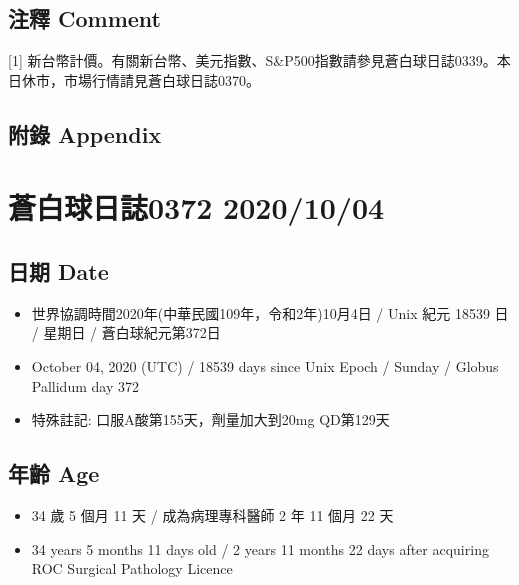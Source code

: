 \documentclass[
]{article}
\providecommand{\tightlist}{%
  \setlength{\itemsep}{0pt}\setlength{\parskip}{0pt}}
\begin{document}
\hypertarget{ux6ce8ux91cb-comment-2}{%
\subsection{注釋 Comment}\label{ux6ce8ux91cb-comment-2}}

{[}1{]}
新台幣計價。有關新台幣、美元指數、S\&P500指數請參見蒼白球日誌0339。本日休市，市場行情請見蒼白球日誌0370。

\hypertarget{ux9644ux9304-appendix-2}{%
\subsection{附錄 Appendix}\label{ux9644ux9304-appendix-2}}

\hypertarget{ux84bcux767dux7403ux65e5ux8a8c0372-20201004}{%
\section{蒼白球日誌0372
2020/10/04}\label{ux84bcux767dux7403ux65e5ux8a8c0372-20201004}}

\hypertarget{ux65e5ux671f-date-3}{%
\subsection{日期 Date}\label{ux65e5ux671f-date-3}}

\begin{itemize}
\tightlist
\item
  世界協調時間2020年(中華民國109年，令和2年)10月4日 / Unix 紀元 18539 日
  / 星期日 / 蒼白球紀元第372日
\item
  October 04, 2020 (UTC) / 18539 days since Unix Epoch / Sunday / Globus
  Pallidum day 372
\item
  特殊註記: 口服A酸第155天，劑量加大到20mg QD第129天
\end{itemize}

\hypertarget{ux5e74ux9f61-age-3}{%
\subsection{年齡 Age}\label{ux5e74ux9f61-age-3}}

\begin{itemize}
\tightlist
\item
  34 歲 5 個月 11 天 / 成為病理專科醫師 2 年 11 個月 22 天
\item
  34 years 5 months 11 days old / 2 years 11 months 22 days after
  acquiring ROC Surgical Pathology Licence
\end{itemize}
\end{document}
